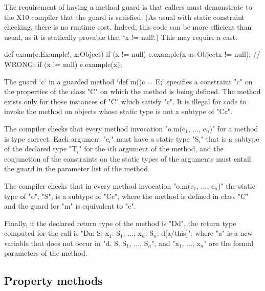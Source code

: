 The requirement of having a method guard is that callers must demonstrate to
the X10
compiler that the guard is satisfied.  (As usual with static constraint
checking, there is no runtime cost.  Indeed, this code can be more efficient
than usual, as it is statically provable that \xcd`x != null`.)
This may require a cast: 
\begin{xten}
  def exam(e:Example!, x:Object) {
    if (x != null) 
       e.example(x as Object{x != null});
    // WRONG: if (x != null) e.example(x);
  }
\end{xten}

The guard \xcd`{c}` 
in a guarded method 
\xcd`def m(){c} = E;`
specifies a constraint \xcd"c" on the
properties of the class \xcd"C" on which the method is being defined. The
method exists only for those instances of \xcd"C" which satisfy \xcd"c".  It is
illegal for code to invoke the method on objects whose static type is
not a subtype of \xcd"C{c}".

\begin{staticrule*}
    The compiler checks that every method invocation
    \xcdmath"o.m(e$_1$, $\dots$, e$_n$)"
    for a method is type correct. Each argument
    \xcdmath"e$_i$" must have a
    static type \xcdmath"S$_i$" that is a subtype of the declared type
    \xcdmath"T$_i$" for the $i$th
    argument of the method, and the conjunction of the constraints on the
    static types 
    of the arguments must entail the guard in the parameter list
    of the method.

    The compiler checks that in every method invocation
    \xcdmath"o.m(e$_1$, $\dots$, e$_n$)"
    the static type of \xcd"o", \xcd"S", is a subtype of \xcd"C{c}", where the method
    is defined in class \xcd"C" and the guard for \xcd"m" is equivalent to
    \xcd"c".

    Finally, if the declared return type of the method is
    \xcd"D{d}", the
    return type computed for the call is
    \xcdmath"D{a: S; x$_1$: S$_1$; $\dots$; x$_n$: S$_n$; d[a/this]}",
    where \xcd"a" is a new
    variable that does not occur in
    \xcdmath"d, S, S$_1$, $\dots$, S$_n$", and
    \xcdmath"x$_1$, $\dots$, x$_n$" are the formal
    parameters of the method.
\end{staticrule*}


\subsection{Property methods}

